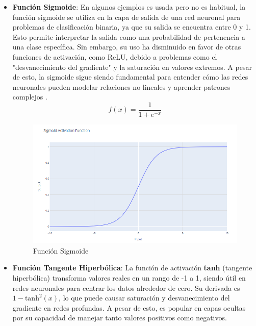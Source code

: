 \begin{itemize}
    \item \textbf{Función Sigmoide}: 
    En algunos ejemplos es usada pero no es habitual, la función sigmoide
    se utiliza en la capa de salida de una red neuronal para problemas
    de clasificación binaria, ya que su salida se encuentra entre 0 y 1.
    Esto permite interpretar la salida como una probabilidad de pertenencia 
    a una clase específica. 
    Sin embargo, su uso ha disminuido en favor de otras funciones de activación,
     como ReLU, debido a problemas como el "desvanecimiento del gradiente" 
     y la saturación en valores extremos. A pesar de esto, la sigmoide sigue 
     siendo fundamental para entender cómo las redes neuronales pueden modelar
      relaciones no lineales y aprender patrones complejos \cite{sigmoid}.
    \begin{equation}
        f(x) = \frac{1}{1 + e^{-x}}
    \end{equation}

    \begin{figure}[H]
        \centering
        \includegraphics[width=\linewidth]{src/figures/sigmoid.png}
        \caption{Función Sigmoide \cite{sigmoid_graph}}
    \end{figure}

    \item \textbf{Función Tangente Hiperbólica}:
    La función de activación \textbf{tanh} (tangente hiperbólica) transforma valores 
    reales en un rango de -1 a 1, siendo útil en redes neuronales para centrar los 
    datos alrededor de cero. Su derivada es \(1 - \text{tanh}^2(x)\), lo que puede 
    causar saturación y desvanecimiento del gradiente en redes profundas. 
    A pesar de esto, es popular en capas ocultas por su capacidad de manejar tanto valores positivos 
    como negativos. \cite{activation_functions}


\end{itemize}
